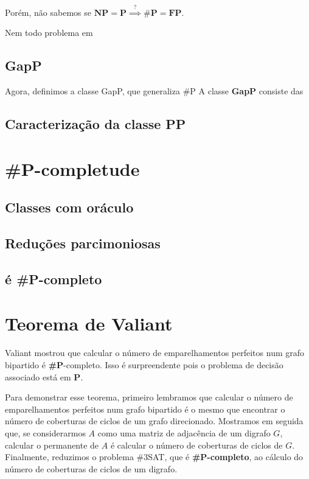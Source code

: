 \documentclass[paper=a4, fontsize=11pt]{scrartcl} %
\numberwithin{equation}{section} %
\numberwithin{figure}{section} %
\numberwithin{table}{section} %
\numberwithin{definition}{section}
\numberwithin{theorem}{section}
\renewcommand{\P}{\textbf{P}\xspace}
\newcommand{\SP}{\textbf{\#P}\xspace}
\newcommand{\NP}{\textbf{NP}\xspace}
\newcommand{\FP}{\textbf{FP}\xspace}
\newcommand{\PP}{\textbf{PP}\xspace}
\newcommand{\gP}{\textbf{GapP}\xspace}
\newcommand{\SPc}{\textbf{\#P-completo}\xspace}
\newcommand{\prob}[1]{\text{\textsc{\textbf{#1}}}}
\begin{document}
Porém, não sabemos se $\NP = \P \stackrel{?}{\implies} \SP = \FP$.

Nem todo problema em 

\subsection{\gP}

Agora, definimos a classe GapP, que generaliza #P
A classe \gP consiste das 


\subsection{Caracterização da classe \PP}

\pagebreak
\section{\SP-completude}

\subsection{Classes com oráculo}
\subsection{Reduções parcimoniosas}
\subsection{\prob{\#SAT} é \SPc}


\pagebreak
\section{Teorema de Valiant}

Valiant mostrou que calcular o número de emparelhamentos perfeitos num grafo bipartido é \SP-completo. Isso é surpreendente pois o problema de decisão associado está em \P. 

Para demonstrar esse teorema, primeiro lembramos que calcular o número de emparelhamentos perfeitos num grafo bipartido é o mesmo que encontrar o número de coberturas de ciclos de um grafo direcionado. Mostramos em seguida que, se considerarmos $A$ como uma matriz de adjacência de um digrafo $G$, calcular o permanente de $A$ é calcular o número de coberturas de ciclos de $G$. Finalmente, reduzimos o problema \#3SAT, que é \SPc, ao cálculo do número de coberturas de ciclos de um digrafo.
\end{document}
